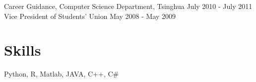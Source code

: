 \documentclass[margin, 10pt]{res} %
\begin{document}
\begin{resume}
Career Guidance, Computer Science Department, Tsinghua \hfill {July 2010 - July 2011} \\
Vice President of Students' Union \hfill {May 2008 - May 2009}


\section{Skills}

Python, R, Matlab, JAVA, C++, C\# \\

\end{resume}
\end{document}
